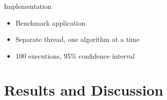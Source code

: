 \documentclass[xcolor={table}]{beamer}
\begin{document}
\begin{frame}{Implementation}
    \begin{itemize}
        \item Benchmark application
        \item Separate thread, one algorithm at a time
        \item 100 executions, 95\% confidence interval
    \end{itemize}
\end{frame}

\section{Results and Discussion}
\end{document}
